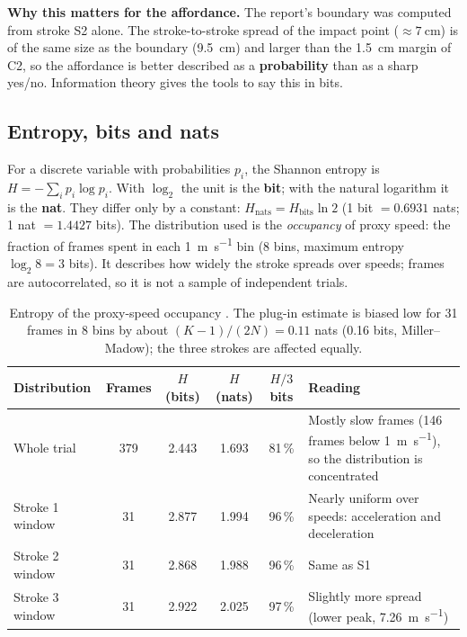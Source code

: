 \textbf{Why this matters for the affordance.} The report's boundary was computed from stroke S2 alone. The stroke-to-stroke spread of the impact point ($\approx\SI{7}{\centi\meter}$) is of the same size as the boundary (\SI{9.5}{\centi\meter}) and larger than the \SI{1.5}{\centi\meter} margin of C2, so the affordance is better described as a \textbf{probability} than as a sharp yes/no. Information theory gives the tools to say this in bits.

\subsection{Entropy, bits and nats}

For a discrete variable with probabilities $p_i$, the Shannon entropy is $H=-\sum_i p_i\log p_i$. With $\log_2$ the unit is the \textbf{bit}; with the natural logarithm it is the \textbf{nat}. They differ only by a constant: $H_{\mathrm{nats}}=H_{\mathrm{bits}}\ln 2$ (1 bit $=0.6931$ nats; 1 nat $=1.4427$ bits). The distribution used is the \emph{occupancy} of proxy speed: the fraction of frames spent in each \SI{1}{\meter\per\second} bin (8 bins, maximum entropy $\log_2 8=3$ bits). It describes how widely the stroke spreads over speeds; frames are autocorrelated, so it is not a sample of independent trials.

\begin{table}[ht]
    \centering
    \caption{Entropy of the proxy-speed occupancy \tagobs. The plug-in estimate is biased low for 31 frames in 8 bins by about $(K-1)/(2N)=0.11$ nats (0.16 bits, Miller--Madow); the three strokes are affected equally.}\label{tab:entropy}
    \footnotesize
    \begin{tabularx}{\textwidth}{@{}l c c c c Y@{}}
        \toprule
        \textbf{Distribution} & \textbf{Frames} & $H$ (bits) & $H$ (nats) & $H/3$ bits & \textbf{Reading}                                                                                     \\
        \midrule
        Whole trial           & 379             & 2.443      & 1.693      & 81\,\%     & Mostly slow frames (146 frames below \SI{1}{\meter\per\second}), so the distribution is concentrated \\
        Stroke 1 window       & 31              & 2.877      & 1.994      & 96\,\%     & Nearly uniform over speeds: acceleration and deceleration                                            \\
        Stroke 2 window       & 31              & 2.868      & 1.988      & 96\,\%     & Same as S1                                                                                           \\
        Stroke 3 window       & 31              & 2.922      & 2.025      & 97\,\%     & Slightly more spread (lower peak, \SI{7.26}{\meter\per\second})                                      \\
        \bottomrule
    \end{tabularx}
\end{table}

